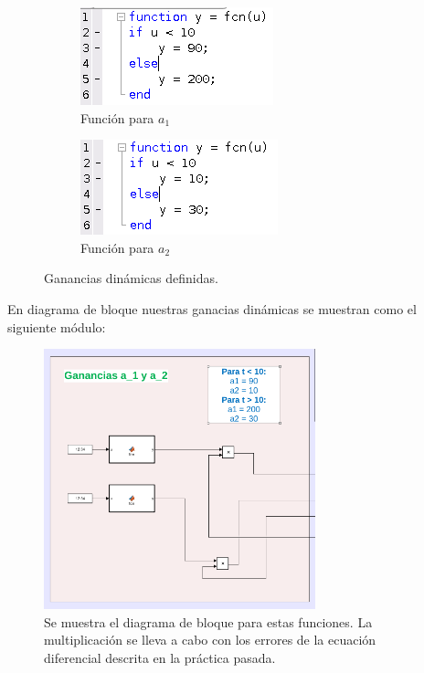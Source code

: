 \documentclass[12pt, letterpaper]{article}
\begin{document}
\begin{figure}[H]
	\centering
	\begin{subfigure}[b]{0.49\linewidth}
		\includegraphics[width=\linewidth]{a1.png}
		\caption{Función para $a_1$}
	\end{subfigure}
	\begin{subfigure}[b]{0.49\linewidth}
		\includegraphics[width=\linewidth]{a2.png}
		\caption{Función para $a_2$}
	\end{subfigure}
	\caption{Ganancias dinámicas definidas.}
\end{figure}

En diagrama de bloque nuestras ganacias dinámicas se muestran como el siguiente módulo:

\begin{figure}[H]
	\centering
	\includegraphics[width=0.7\textwidth]{dgain.png}
	\caption{Se muestra el diagrama de bloque para estas funciones. La multiplicación se lleva a cabo con los errores de la ecuación diferencial descrita en la práctica pasada.}
\end{figure}
\end{document}
